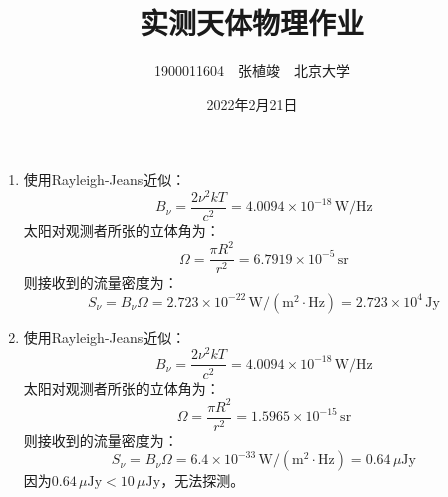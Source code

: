 \documentclass[a4paper]{article}
\begin{document}
\title{\textbf{实测天体物理作业}}
\author{1900011604\ \ 张植竣\ \ 北京大学}
\date{2022年2月21日}
\maketitle

\begin{enumerate}

    \item[1.]
    使用Rayleigh-Jeans近似：
    \[
        B_\nu = \frac{2\nu^2kT}{c^2} = 4.0094\times10^{-18}\,\mathrm{W/Hz}
    \]
    太阳对观测者所张的立体角为：
    \[
        \Omega = \frac{\pi R^2}{r^2} = 6.7919\times10^{-5}\,\mathrm{sr}
    \]
    则接收到的流量密度为：
    \[
        S_\nu = B_\nu\Omega = 2.723\times10^{-22}\,\mathrm{W/(m^2\cdot Hz)} = 2.723\times10^4\,\mathrm{Jy}
    \]

    \item[2.]
    使用Rayleigh-Jeans近似：
    \[
        B_\nu = \frac{2\nu^2kT}{c^2} = 4.0094\times10^{-18}\,\mathrm{W/Hz}
    \]
    太阳对观测者所张的立体角为：
    \[
        \Omega = \frac{\pi R^2}{r^2} = 1.5965\times10^{-15}\,\mathrm{sr}
    \]
    则接收到的流量密度为：
    \[
        S_\nu = B_\nu\Omega = 6.4\times10^{-33}\,\mathrm{W/(m^2\cdot Hz)} = 0.64\,\mu\mathrm{Jy}
    \]
    因为$0.64\,\mu\mathrm{Jy}<10\,\mu\mathrm{Jy}$，无法探测。

\end{enumerate}
\end{document}
